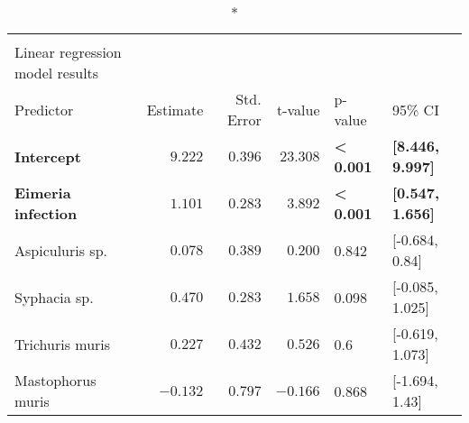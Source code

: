 \begin{longtable}{lrrrll}
\caption*{
{\large } \\ 
{\small Linear regression model results}
} \\ 
\toprule
Predictor & Estimate & Std. Error & t-value & p-value & 95\% CI \\ 
\midrule\addlinespace[2.5pt]
\textbf{Intercept} & \textbf{$9.222$} & \textbf{$0.396$} & \textbf{$23.308$} & \textbf{< 0.001} & \textbf{[8.446, 9.997]} \\ 
\textbf{Eimeria infection} & \textbf{$1.101$} & \textbf{$0.283$} & \textbf{$3.892$} & \textbf{< 0.001} & \textbf{[0.547, 1.656]} \\ 
Aspiculuris sp. & $0.078$ & $0.389$ & $0.200$ & 0.842 & [-0.684, 0.84] \\ 
Syphacia sp. & $0.470$ & $0.283$ & $1.658$ & 0.098 & [-0.085, 1.025] \\ 
Trichuris muris & $0.227$ & $0.432$ & $0.526$ & 0.6 & [-0.619, 1.073] \\ 
Mastophorus muris & $-0.132$ & $0.797$ & $-0.166$ & 0.868 & [-1.694, 1.43] \\ 
\bottomrule
\end{longtable}

